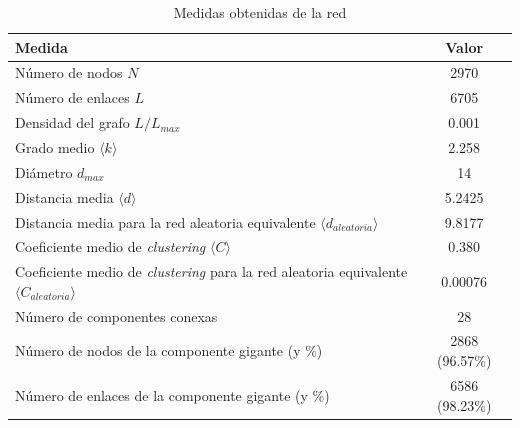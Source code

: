 \begin{table}[h!]
    \caption{Medidas obtenidas de la red}
    \label{tab:metrics}
    \begin{center}
        \begin{tabular}{ |p{8cm}|c| }
            \hline
            \textbf{Medida}                                              & \textbf{Valor} \\
            \hline
            Número de nodos $N$                                          & 2970           \\
            \hline
            Número de enlaces $L$                                        & 6705           \\
            \hline
            Densidad del grafo $L/L_{max}$                               & 0.001          \\
            \hline
            Grado medio $\langle k \rangle$                              & 2.258          \\
            \hline
            Diámetro $d_{max}$                                           & 14             \\
            \hline
            Distancia media $\langle d \rangle$                          & 5.2425         \\
            \hline
            Distancia media para la red aleatoria equivalente $\langle
            d_{aleatoria} \rangle$                                       & 9.8177         \\
            \hline
            Coeficiente medio de \textit{clustering} $\langle C \rangle$ & 0.380          \\
            \hline
            Coeficiente medio de \textit{clustering} para la red aleatoria
            equivalente $\langle C_{aleatoria} \rangle$                  & 0.00076        \\
            \hline
            Número de componentes conexas                                & 28             \\
            \hline
            Número de nodos de la componente gigante (y \%)              & 2868 (96.57\%) \\
            \hline
            Número de enlaces de la componente gigante (y \%)            & 6586 (98.23\%) \\
            \hline
        \end{tabular}
    \end{center}
\end{table}

